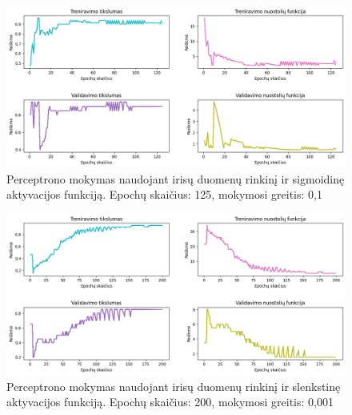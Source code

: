 \documentclass{VUMIFPSbakalaurinis}
\begin{document}
\begin{figure}[H]
  \centering
  \includegraphics[scale=0.5]{img/3.png}
  \caption{Perceptrono mokymas naudojant irisų
   duomenų rinkinį ir sigmoidinę aktyvacijos funkciją.
   Epochų skaičius: 125, mokymosi greitis: 0,1}
  \label{img:iris-sigmoid}
\end{figure}


\begin{figure}[H]
  \centering
  \includegraphics[scale=0.5]{img/4.png}
  \caption{Perceptrono mokymas naudojant irisų
   duomenų rinkinį ir slenkstinę aktyvacijos funkciją.
   Epochų skaičius: 200, mokymosi greitis: 0,001}
  \label{img:iris-heaviside}
\end{figure}
\end{document}
